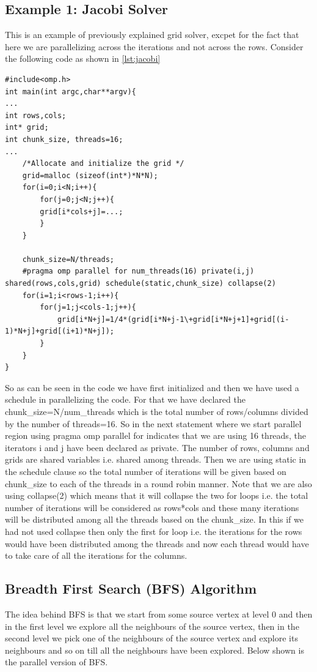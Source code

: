 \documentclass[12pt]{book}
\begin{document}
\subsection{Example 1: Jacobi Solver}
This is an example of previously explained grid solver, excpet for the fact that here we are parallelizing across the iterations and not across the rows. Consider the following code as shown in \ref{lst:jacobi}
\begin{lstlisting}[caption={jacobi-solver},captionpos=b,label={lst:jacobi}]
#include<omp.h>
int main(int argc,char**argv){
...
int rows,cols;
int* grid;
int chunk_size, threads=16;
...
    /*Allocate and initialize the grid */
    grid=malloc (sizeof(int*)*N*N);
    for(i=0;i<N;i++){
        for(j=0;j<N;j++){
        grid[i*cols+j]=...;
        }
    }

    chunk_size=N/threads;
    #pragma omp parallel for num_threads(16) private(i,j) shared(rows,cols,grid) schedule(static,chunk_size) collapse(2)
    for(i=1;i<rows-1;i++){
        for(j=1;j<cols-1;j++){
            grid[i*N+j]=1/4*(grid[i*N+j-1\+grid[i*N+j+1]+grid[(i-1)*N+j]+grid[(i+1)*N+j]);
        }
    }
}
\end{lstlisting}
So as can be seen in the code we have first initialized and then we have used a schedule in parallelizing the code.
For that we have declared the chunk\_size=N/num\_threads which is the total number of rows/columns divided by the number of threads=16. So in the next statement where we start parallel region using pragma omp parallel for indicates that we are using 16 threads, the iterators i and j have been declared as private. The number of rows, columns and grids are shared variables i.e. shared among threads. Then we are using static in the schedule clause so the total number of iterations will be given based on chunk\_size to each of the threads in a round robin manner. Note that we are also using collapse(2) which means that it will collapse the two for loops i.e. the total number of iterations will be considered as rows*cols and these many iterations will be distributed among all the threads based on the chunk\_size. In this if we had not used collapse then only the first for loop i.e. the iterations for the rows would have been distributed among the threads and now each thread would have to take care of all the iterations for the columns.

\subsection{Breadth First Search (BFS) Algorithm}
The idea behind BFS is that we start from some source vertex at level 0 and then in the first level we explore all the neighbours of the source vertex, then in the second level we pick one of the neighbours of the source vertex and explore its neighbours and so on till all the neighbours have been explored. Below shown is the parallel version of BFS.
\end{document}
